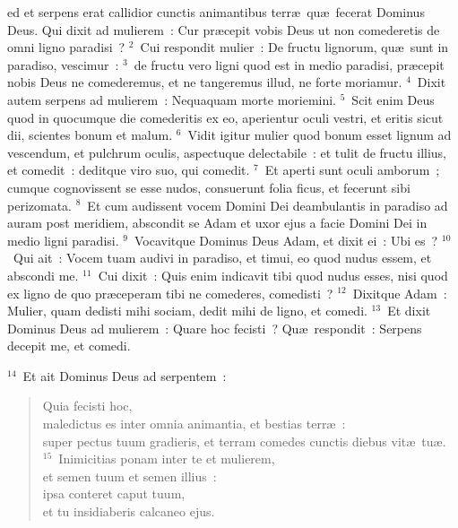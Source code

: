 \bchapter
{}ed et serpens erat callidior cunctis animantibus terr\ae\ qu\ae\ fecerat Dominus Deus. Qui dixit ad mulierem~: Cur pr\ae cepit vobis Deus ut non comederetis de omni ligno paradisi~?
${}^{2}$~Cui respondit mulier~: De fructu lignorum, qu\ae\ sunt in paradiso, vescimur~:
${}^{3}$~de fructu vero ligni quod est in medio paradisi, pr\ae cepit nobis Deus ne comederemus, et ne tangeremus illud, ne forte moriamur.
${}^{4}$~Dixit autem serpens ad mulierem~: Nequaquam morte moriemini.
${}^{5}$~Scit enim Deus quod in quocumque die comederitis ex eo, aperientur oculi vestri, et eritis sicut dii, scientes bonum et malum.
${}^{6}$~Vidit igitur mulier quod bonum esset lignum ad vescendum, et pulchrum oculis, aspectuque delectabile~: et tulit de fructu illius, et comedit~: deditque viro suo, qui comedit.
${}^{7}$~Et aperti sunt oculi amborum~; cumque cognovissent se esse nudos, consuerunt folia ficus, et fecerunt sibi perizomata.
${}^{8}$~Et cum audissent vocem Domini Dei deambulantis in paradiso ad auram post meridiem, abscondit se Adam et uxor ejus a facie Domini Dei in medio ligni paradisi.
${}^{9}$~Vocavitque Dominus Deus Adam, et dixit ei~: Ubi es~?
${}^{10}$~Qui ait~: Vocem tuam audivi in paradiso, et timui, eo quod nudus essem, et abscondi me.
${}^{11}$~Cui dixit~: Quis enim indicavit tibi quod nudus esses, nisi quod ex ligno de quo pr\ae ceperam tibi ne comederes, comedisti~?
${}^{12}$~Dixitque Adam~: Mulier, quam dedisti mihi sociam, dedit mihi de ligno, et comedi.
${}^{13}$~Et dixit Dominus Deus ad mulierem~: Quare hoc fecisti~? Qu\ae\ respondit~: Serpens decepit me, et comedi.


${}^{14}$~Et ait Dominus Deus ad serpentem~: \begin{verse}Quia fecisti hoc,\\ maledictus es inter omnia animantia, et bestias terr\ae~:\\ super pectus tuum gradieris, et terram comedes cunctis diebus vit\ae\ tu\ae .\\
${}^{15}$~Inimicitias ponam inter te et mulierem,\\ et semen tuum et semen illius~:\\ ipsa conteret caput tuum,\\ et tu insidiaberis calcaneo ejus.\end{verse}



